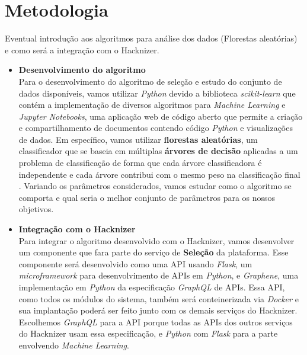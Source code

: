 \documentclass[10pt,twoside,a4paper]{article}
\begin{document}
\section{Metodologia}

      Eventual introdução aos algoritmos para análise dos dados (Florestas aleatórias) e como será a integração com o Hacknizer.
      
      \begin{itemize}
          \item \textbf{Desenvolvimento do algoritmo} \\
          Para o desenvolvimento do algoritmo de seleção e estudo do conjunto de dados disponíveis, vamos utilizar \textit{Python} devido a biblioteca \textit{scikit-learn} que contém a implementação de diversos algoritmos para \textit{Machine Learning} e \textit{Jupyter Notebooks}, uma aplicação web de código aberto que permite a criação e compartilhamento de documentos contendo código \textit{Python} e visualizações de dados. Em específico, vamos utilizar \textbf{florestas aleatórias}, um classificador que se baseia em múltiplas \textbf{árvores de decisão} aplicadas a um problema de classificação de forma que cada árvore classificadora é independente e cada árvore contribui com o mesmo peso na classificação final \cite{Breiman2001RandomForests}. Variando os parâmetros considerados, vamos estudar como o algoritmo se comporta e qual seria o melhor conjunto de parâmetros para os nossos objetivos.
          
          \item \textbf{Integração com o Hacknizer} \\
          Para integrar o algoritmo desenvolvido com o Hacknizer, vamos desenvolver um componente que fara parte do serviço de \textbf{Seleção} da plataforma. Esse componente será desenvolvido como uma API usando \textit{Flask}, um \textit{microframework} para desenvolvimento de APIs em \textit{Python}, e \textit{Graphene}, uma implementação em \textit{Python} da especificação \textit{GraphQL} de APIs. Essa API, como todos os módulos do sistema, também será conteinerizada via \textit{Docker} e sua implantação poderá ser feito junto com os demais serviços do Hacknizer.
          Escolhemos \textit{GraphQL} para a API porque todas as APIs dos outros serviços do Hacknizer usam essa especificação, e \textit{Python} com \textit{Flask} para a parte envolvendo \textit{Machine Learning}.
      \end{itemize}
    
\end{document}
